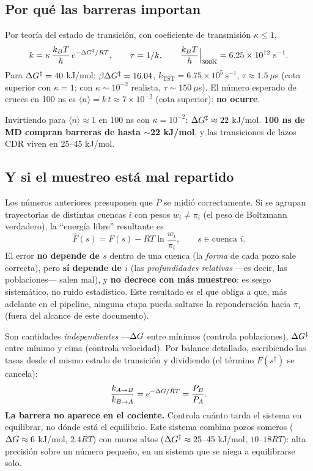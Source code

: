 \documentclass[11pt]{article}
\begin{document}
\subsection{Por qué las barreras importan}

Por teoría del estado de transición, con coeficiente de transmisión $\kappa\le1$,
$$k = \kappa\,\frac{k_B T}{h}\,e^{-\Delta G^{\ddagger}/RT}, \qquad \tau = 1/k, \qquad \frac{k_B T}{h}\Big|_{300\text{K}} = 6.25\times10^{12}\ \text{s}^{-1}.$$
Para $\Delta G^{\ddagger}=40$ kJ/mol: $\beta\Delta G^{\ddagger}=16.04$, $k_{\text{TST}}=6.75\times10^5\ \text{s}^{-1}$, $\tau\approx1.5\ \mu$s (cota superior con $\kappa=1$; con $\kappa\sim10^{-2}$ realista, $\tau\sim150\ \mu$s). El número esperado de cruces en 100 ns es $\langle n\rangle = k\,t \approx 7\times10^{-2}$ (cota superior): \textbf{no ocurre}.

Invirtiendo para $\langle n\rangle\approx1$ en 100 ns con $\kappa=10^{-2}$: $\Delta G^{\ddagger}\approx22$ kJ/mol. \textbf{100 ns de MD compran barreras de hasta $\sim$22 kJ/mol}, y las transiciones de lazos CDR viven en 25--45 kJ/mol.

\subsection{Y si el muestreo está mal repartido}
Los números anteriores presuponen que $P$ se midió correctamente. Si se agrupan trayectorias de distintas cuencas $i$ con pesos $w_i\ne\pi_i$ (el peso de Boltzmann verdadero), la ``energía libre'' resultante es
$$\hat F(s) = F(s) - RT\ln\frac{w_i}{\pi_i}, \qquad s\in\text{cuenca } i.$$
El error \textbf{no depende de $s$} dentro de una cuenca (la \emph{forma} de cada pozo sale correcta), pero \textbf{sí depende de $i$} (las \emph{profundidades relativas} —es decir, las poblaciones— salen mal), y \textbf{no decrece con más muestreo}: es sesgo sistemático, no ruido estadístico. Este resultado es el que obliga a que, más adelante en el pipeline, ninguna etapa pueda saltarse la reponderación hacia $\pi_i$ (fuera del alcance de este documento).

\begin{aviso}
Son cantidades \emph{independientes} —$\Delta G$ entre mínimos (controla poblaciones), $\Delta G^{\ddagger}$ entre mínimo y cima (controla velocidad). Por balance detallado, escribiendo las tasas desde el mismo estado de transición y dividiendo (el término $F(s^\ddagger)$ se cancela):
$$\frac{k_{A\to B}}{k_{B\to A}} = e^{-\Delta G/RT} = \frac{P_B}{P_A}.$$
\textbf{La barrera no aparece en el cociente.} Controla cuánto tarda el sistema en equilibrar, no dónde está el equilibrio. Este sistema combina pozos someros ($\Delta G\approx6$ kJ/mol, $2.4RT$) con muros altos ($\Delta G^{\ddagger}\approx25$--45 kJ/mol, $10$--$18RT$): alta precisión sobre un número pequeño, en un sistema que se niega a equilibrarse solo.
\end{aviso}
\end{document}

